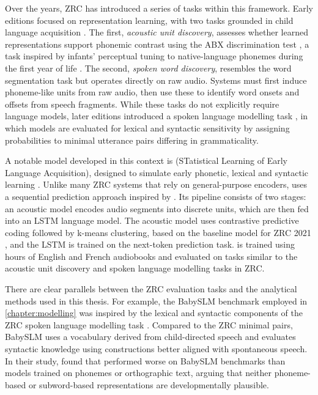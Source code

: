 Over the years, ZRC has introduced a series of tasks within this framework. Early editions focused on representation learning, with two tasks grounded in child language acquisition \citep{versteegh2015zero, dunbar2017zero}. The first, \emph{acoustic unit discovery}, assesses whether learned representations support phonemic contrast using the ABX discrimination test \citep{schatz2016abx}, a task inspired by infants' perceptual tuning to native-language phonemes during the first year of life \citep{werker1984cross, kuhl1991human}. The second, \emph{spoken word discovery}, resembles the word segmentation task but operates directly on raw audio. Systems must first induce phoneme-like units from raw audio, then use these to identify word onsets and offsets from speech fragments. While these tasks do not explicitly require language models, later editions introduced a spoken language modelling task \citep{dunbar2021zero}, in which models are evaluated for lexical and syntactic sensitivity by assigning probabilities to minimal utterance pairs differing in grammaticality.

A notable model developed in this context is \stela (STatistical Learning of Early Language Acquisition), designed to simulate early phonetic, lexical and syntactic learning \citep{lavechin2022can, lavechin2025simulating}. Unlike many ZRC systems that rely on general-purpose encoders, \stela uses a sequential prediction approach inspired by \citet{elman-1990-finding}. Its pipeline consists of two stages: an acoustic model encodes  audio segments into discrete units, which are then fed into an LSTM language model. The acoustic model uses contrastive predictive coding followed by k-means clustering, based on the baseline model for ZRC 2021 \citep{nguyen2020zero}, and the LSTM is trained on the next-token prediction task. \stela is trained using  hours of English and French audiobooks and evaluated on tasks similar to the acoustic unit discovery and spoken language modelling tasks in ZRC.

There are clear parallels between the ZRC evaluation tasks and the analytical methods used in this thesis. For example, the BabySLM benchmark employed in \cref{chapter:modelling} was inspired by the lexical and syntactic components of the ZRC spoken language modelling task \citep{lavechin}. Compared to the ZRC minimal pairs, BabySLM uses a vocabulary derived from child-directed speech and evaluates syntactic knowledge using constructions better aligned with spontaneous speech. In their study, \citet{lavechin} found that \stela performed worse on BabySLM benchmarks than models trained on phonemes or orthographic text, arguing that neither phoneme-based or subword-based representations are developmentally plausible.

